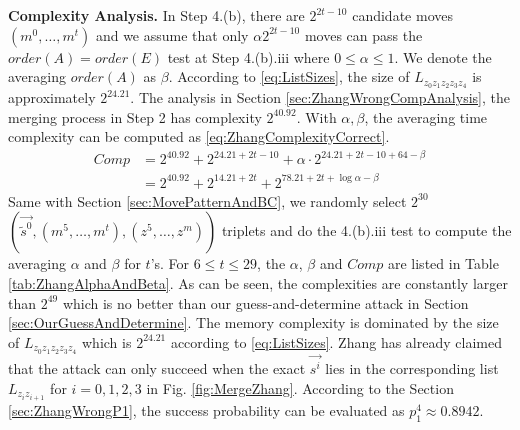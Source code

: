 \noindent\textbf{Complexity Analysis. }
In Step 4.(b), there are $2^{2t-10}$ candidate moves $(m^0,\ldots, m^{t})$ and we assume that only $\alpha 2^{2t-10}$ moves can pass the $order(A)=order(E)$ test at Step 4.(b).iii where $0\leq \alpha \leq 1$.
We denote the averaging $order(A)$ as $\beta $.
According to \eqref{eq:ListSizes}, the size of $L_{z_0z_1z_2z_3z_4}$ is approximately $2^{24.21}$. 
The analysis in Section \ref{sec:ZhangWrongCompAnalysis}, the merging process in Step 2 has complexity $2^{40.92}$.
With $\alpha ,\beta $, the averaging time complexity can be computed as \eqref{eq:ZhangComplexityCorrect}. 
\begin{equation}\label{eq:ZhangComplexityCorrect}
\begin{aligned}
Comp&=2^{40.92}+2^{24.21+2t-10}+\alpha \cdot 2^{24.21+2t-10+64-\beta}\\
&=2^{40.92}+2^{14.21+2t}+2^{78.21+2t+\log \alpha -\beta}
\end{aligned}
\end{equation}
Same with Section \ref{sec:MovePatternAndBC}, we randomly select $2^{30}$ $\left(\vec{\tilde{s}^0}, (m^5,\ldots, m^t), (z^5,\ldots, z^m)\right)$ triplets and do the 4.(b).iii test to compute the averaging $\alpha$ and $\beta$ for $t$'s.
For $6\leq t\leq 29$, the $\alpha$, $\beta$ and $Comp$ are listed in Table \ref{tab:ZhangAlphaAndBeta}. 
As can be seen, the complexities are constantly larger than $2^{49}$ which is no better than our guess-and-determine attack in Section \ref{sec:OurGuessAndDetermine}. 
The memory complexity is dominated by the size of $L_{z_0z_1z_2z_3z_4}$ which is $2^{24.21}$ according to \eqref{eq:ListSizes}. 
Zhang \etal has already claimed that the attack can only succeed when the exact $\vec{s^i}$ lies in the corresponding list $L_{z_iz_{i+1}}$ for $i=0,1,2,3$ in Fig. \ref{fig:MergeZhang}. 
According to the Section \ref{sec:ZhangWrongP1}, the success probability can be evaluated as $p_1^4\approx 0.8942$. 


